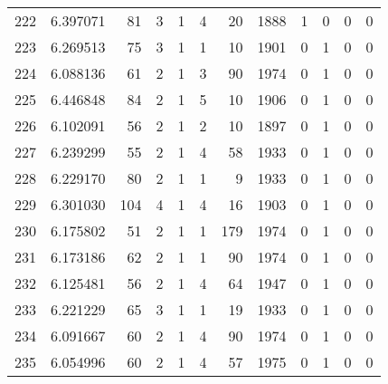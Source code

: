 \begin{tabular}{lrrrrrrrrrrr}
222 &  6.397071 &   81 &      3 &        1 &      4 &              20 &  1888 &               1 &               0 &               0 &               0 \\
223 &  6.269513 &   75 &      3 &        1 &      1 &              10 &  1901 &               0 &               1 &               0 &               0 \\
224 &  6.088136 &   61 &      2 &        1 &      3 &              90 &  1974 &               0 &               1 &               0 &               0 \\
225 &  6.446848 &   84 &      2 &        1 &      5 &              10 &  1906 &               0 &               1 &               0 &               0 \\
226 &  6.102091 &   56 &      2 &        1 &      2 &              10 &  1897 &               0 &               1 &               0 &               0 \\
227 &  6.239299 &   55 &      2 &        1 &      4 &              58 &  1933 &               0 &               1 &               0 &               0 \\
228 &  6.229170 &   80 &      2 &        1 &      1 &               9 &  1933 &               0 &               1 &               0 &               0 \\
229 &  6.301030 &  104 &      4 &        1 &      4 &              16 &  1903 &               0 &               1 &               0 &               0 \\
230 &  6.175802 &   51 &      2 &        1 &      1 &             179 &  1974 &               0 &               1 &               0 &               0 \\
231 &  6.173186 &   62 &      2 &        1 &      1 &              90 &  1974 &               0 &               1 &               0 &               0 \\
232 &  6.125481 &   56 &      2 &        1 &      4 &              64 &  1947 &               0 &               1 &               0 &               0 \\
233 &  6.221229 &   65 &      3 &        1 &      1 &              19 &  1933 &               0 &               1 &               0 &               0 \\
234 &  6.091667 &   60 &      2 &        1 &      4 &              90 &  1974 &               0 &               1 &               0 &               0 \\
235 &  6.054996 &   60 &      2 &        1 &      4 &              57 &  1975 &               0 &               1 &               0 &               0 \\

\end{tabular}
